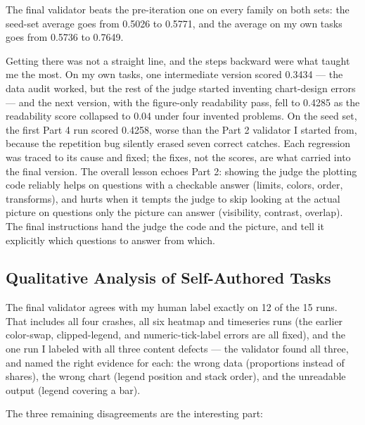 \documentclass[11pt]{article}
\begin{document}
The final validator beats the pre-iteration one on every family on both sets: the seed-set average goes from 0.5026 to 0.5771, and the average on my own tasks goes from 0.5736 to 0.7649.

Getting there was not a straight line, and the steps backward were what taught me the most. On my own tasks, one intermediate version scored 0.3434 --- the data audit worked, but the rest of the judge started inventing chart-design errors --- and the next version, with the figure-only readability pass, fell to 0.4285 as the readability score collapsed to 0.04 under four invented problems. On the seed set, the first Part 4 run scored 0.4258, worse than the Part 2 validator I started from, because the repetition bug silently erased seven correct catches. Each regression was traced to its cause and fixed; the fixes, not the scores, are what carried into the final version. The overall lesson echoes Part 2: showing the judge the plotting code reliably helps on questions with a checkable answer (limits, colors, order, transforms), and hurts when it tempts the judge to skip looking at the actual picture on questions only the picture can answer (visibility, contrast, overlap). The final instructions hand the judge the code and the picture, and tell it explicitly which questions to answer from which.

\subsection{Qualitative Analysis of Self-Authored Tasks}

The final validator agrees with my human label exactly on 12 of the 15 runs. That includes all four crashes, all six heatmap and timeseries runs (the earlier color-swap, clipped-legend, and numeric-tick-label errors are all fixed), and the one run I labeled with all three content defects --- the validator found all three, and named the right evidence for each: the wrong data (proportions instead of shares), the wrong chart (legend position and stack order), and the unreadable output (legend covering a bar).

The three remaining disagreements are the interesting part:
\end{document}
